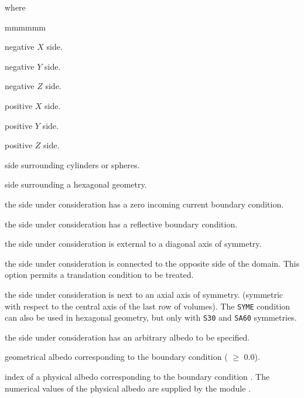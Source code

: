 \noindent where
\begin{ListeDeDescription}{mmmmmm}

\item[\moc{X-}] negative $X$ side.

\item[\moc{Y-}] negative $Y$ side.

\item[\moc{Z-}] negative $Z$ side.	

\item[\moc{X+}] positive $X$ side.

\item[\moc{Y+}] positive $Y$ side.

\item[\moc{Z+}] positive $Z$ side.

\item[\moc{R+}] side surrounding cylinders or spheres.

\item[\moc{HBC}] side surrounding a hexagonal geometry.

\item[\moc{VOID}] the side under consideration has a  zero incoming current
boundary condition.

\item[\moc{REFL}] the side under consideration has a reflective boundary condition. 

\item[\moc{DIAG}] the side under consideration is external to a diagonal axis of symmetry.

\item[\moc{TRAN}] the side under consideration is connected to the opposite side of the domain. This option permits a translation condition to be treated.

\item[\moc{SYME}] the side under consideration is next to an axial axis of symmetry. (symmetric with respect to the central axis of the last row of volumes). The {\tt SYME} condition can also be used in hexagonal geometry, but only with {\tt S30} and {\tt SA60} symmetries.

\item[\moc{ALBE}] the side under consideration has an arbitrary albedo to be specified. 

\item[\dusa{albedo}] geometrical albedo corresponding to the boundary condition  ( $\ge$ 0.0). 

\item[\dusa{icode}] index of a physical albedo corresponding to the boundary condition . The numerical values of the physical albedo are supplied by the module .


\end{ListeDeDescription}
